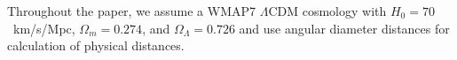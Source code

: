\documentclass[usenatbib,useAMS]{mnras}
\theoremstyle{remark}
\newcommand{\sukhdeep}[1]{{\textcolor{magenta}{SS: #1}}}
\newcommand{\rachel}[1]{{\textcolor{cyan}{RM: #1}}}
\begin{document}
	Throughout the paper, we assume a WMAP7 
$\Lambda$CDM cosmology with $H_0 = 70$~km/s/Mpc, $\Omega_m = 0.274$, 
and $\Omega_\Lambda = 0.726$
\citep{Komatsu2011}
and use angular diameter distances for calculation
of physical distances.
%
%
% 
%
\end{document}

